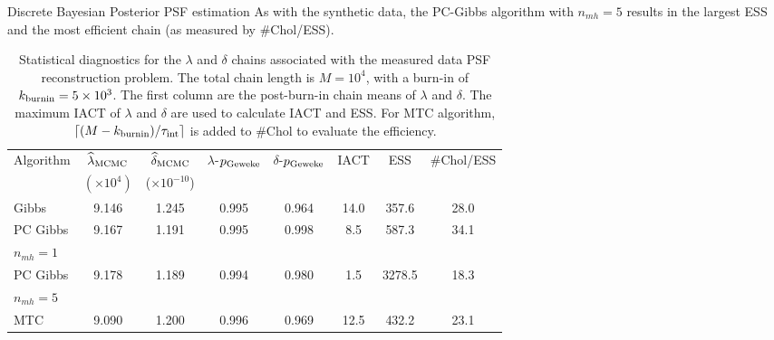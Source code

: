 \begin{chapter}{Discrete Bayesian Posterior PSF estimation}
As with the synthetic data, the PC-Gibbs algorithm with $n_{mh}=5$ results in the largest ESS and the most efficient chain (as measured by $\#$Chol/ESS).

\begin{table}[h]
\begin{center}
  \begin{tabular}{l|ccccccc}
    \hline
    Algorithm           & $\hat{\lambda}_{\rm MCMC}$& $\hat{\delta}_{\rm MCMC}$& $\lambda$-$p_{\rm Geweke}$&$\delta$-$p_{\rm Geweke}$& IACT & ESS    & \#Chol/ESS \\
     & $(\times 10^{4})$ & ($\times 10^{-10}$) & & \\
    \hline
	          Gibbs &                 9.146 &               1.245  &                     0.995 &                    0.964& 14.0 &  357.6 &      28.0 \\
PC Gibbs  &                 9.167 &               1.191  &                     0.995 &                    0.998&  8.5 &  587.3 &      34.1 \\
 \hspace{.2in}$n_{mh}=1$ & & & & & & & \\
PC Gibbs &                 9.178 &               1.189  &                     0.994 &                    0.980&  1.5 & 3278.5 &      18.3 \\
\hspace{.2in} $n_{mh}=5$ & & & & & & & \\
		    MTC &                 9.090 &               1.200  &                     0.996 &                    0.969& 12.5 &  432.2 &      23.1 \\
    \hline
  \end{tabular}
  \caption{ Statistical diagnostics for the $\lambda$ and $\delta$ chains associated with the measured data PSF reconstruction problem. The total chain length is $M=10^4$, with a burn-in of $k_{\rm burnin} = 5\times10^3$. The first column are the post-burn-in chain means of $\lambda$ and $\delta$. The maximum IACT of $\lambda$ and $\delta$ are used to calculate IACT and ESS. For MTC algorithm, $\lceil(M-k_{\rm burnin})/\tau_{\rm int}\rceil$ is added to \#Chol to evaluate the efficiency.} \label{tab:CygnusPsfRecon}
\end{center}
\end{table}


\end{chapter}
